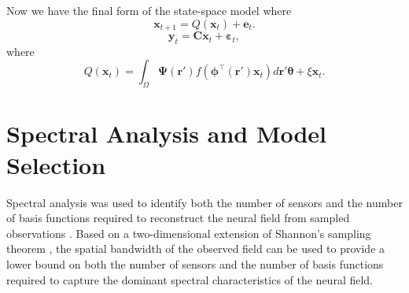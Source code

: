 \documentclass[twocolumn,11pt,a4paper]{article}		%
\begin{document}
Now we have the final form of the state-space model where
\begin{equation}
	\mathbf{x}_{t+1} = Q(\mathbf{x}_t) +\mathbf{e}_t.
\end{equation}
\begin{equation} 
	\mathbf{y}_t = \mathbf{C}\mathbf{x}_t + \boldsymbol{\varepsilon}_t,
\end{equation}
where 
\begin{equation}\label{eq:QmatrixForSigmapoints}
	Q(\mathbf{x}_t) = \int_\Omega \boldsymbol{\Psi}(\mathbf{r}') f(\boldsymbol{\phi}^{\top}(\mathbf{r}')\mathbf{x}_t) d\mathbf{r}' \boldsymbol{\theta} + \xi\mathbf{x}_t.
\end{equation}

\section{Spectral Analysis and Model Selection}\label{SpectralAnalysisSection} Spectral analysis was used to identify both the number of sensors and the number of basis functions required to reconstruct the neural field from sampled observations \cite{Sanner1992,Scerri2009}. Based on a two-dimensional extension of Shannon's sampling theorem \cite{Peterson1962}, the spatial bandwidth of the observed field can be used to provide a lower bound on both the number of sensors and the number of basis functions required to capture the dominant spectral characteristics of the neural field.
\end{document}
